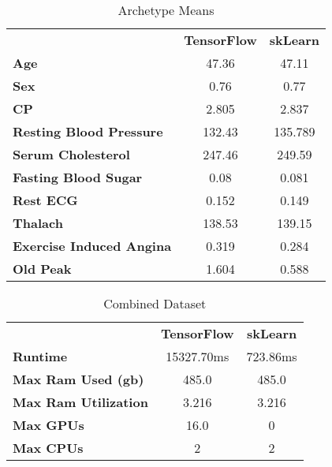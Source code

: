 \documentclass[conference]{IEEEtran}
\begin{document}
\FloatBarrier
\begin{table}[!htbp]
\caption{Archetype Means}
\begin{center}
\begin{tabular}{|l|c|c|}
\hline
\textbf{ }&\textbf{TensorFlow}&\textbf{skLearn} \\
\cline{1-3} 
\textbf{Age} & 47.36 & 47.11 \\
\cline{1-3} 
\textbf{Sex} & 0.76 & 0.77 \\
\cline{1-3} 
\textbf{CP} & 2.805 & 2.837 \\
\cline{1-3} 
\textbf{Resting Blood Pressure} & 132.43 & 135.789 \\
\cline{1-3} 
\textbf{Serum Cholesterol} & 247.46 & 249.59 \\
\cline{1-3} 
\textbf{Fasting Blood Sugar} & 0.08 & 0.081 \\
\cline{1-3} 
\textbf{Rest ECG} & 0.152 & 0.149 \\
\cline{1-3} 
\textbf{Thalach} & 138.53 & 139.15 \\
\cline{1-3} 
\textbf{Exercise Induced Angina} & 0.319 & 0.284 \\
\cline{1-3} 
\textbf{Old Peak} & 1.604 & 0.588 \\
\hline
\end{tabular}
\label{tab13}
\end{center}
\end{table}
\FloatBarrier

\FloatBarrier
\begin{table}[htbp]
\caption{Combined Dataset}
\begin{center}
\begin{tabular}{|l|c|c|}
\hline
\textbf{ }&\textbf{TensorFlow}&\textbf{skLearn} \\
\cline{1-3} 
\textbf{Runtime} & 15327.70ms & 723.86ms \\
\cline{1-3} 
\textbf{Max Ram Used (gb)} & 485.0 & 485.0 \\
\cline{1-3} 
\textbf{Max Ram Utilization} & 3.216 & 3.216 \\
\cline{1-3} 
\textbf{Max GPUs} & 16.0 & 0 \\
\cline{1-3} 
\textbf{Max CPUs} & 2 & 2 \\
\hline
\end{tabular}
\label{tab14}
\end{center}
\end{table}
\FloatBarrier
\end{document}
